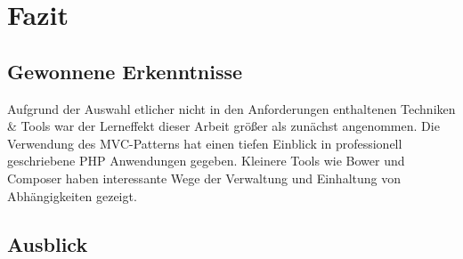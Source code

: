 \chapter{Fazit}\label{ch:fazit}
\section{Gewonnene Erkenntnisse}\label{sec:gewonnene-erkenntnisse}
Aufgrund der Auswahl etlicher nicht in den Anforderungen enthaltenen Techniken \&{} Tools war der Lerneffekt dieser Arbeit größer als zunächst angenommen. Die Verwendung des MVC-Patterns hat einen tiefen Einblick in professionell geschriebene PHP Anwendungen gegeben. Kleinere Tools wie Bower und Composer haben interessante Wege der Verwaltung und Einhaltung von Abhängigkeiten gezeigt. 
\section{Ausblick}\label{sec:ausblick}